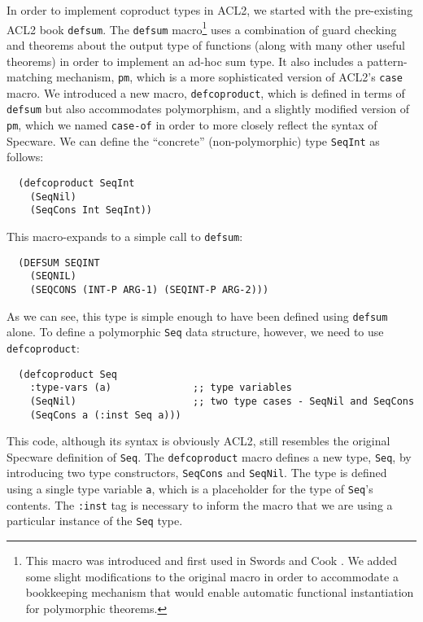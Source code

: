 \documentclass[]{eptcs}
\begin{document}
In order to implement coproduct types in ACL2, we started with the pre-existing ACL2 book \verb|defsum|. The \verb|defsum| macro\footnote{This macro was introduced and first used in Swords and Cook \cite{swords}. We added some slight modifications to the original macro in order to accommodate a bookkeeping mechanism that would enable automatic functional instantiation for polymorphic theorems.} uses a combination of guard checking and theorems about the output type of functions (along with many other useful theorems) in order to implement an ad-hoc sum type. It also includes a pattern-matching mechanism, \verb|pm|, which is a more sophisticated version of ACL2's \verb|case| macro. We introduced a new macro, \verb|defcoproduct|, which is defined in terms of \verb|defsum| but also accommodates polymorphism, and a slightly modified version of \verb|pm|, which we named \verb|case-of| in order to more closely reflect the syntax of Specware. We can define the ``concrete'' (non-polymorphic) type \verb|SeqInt| as follows:
\begin{verbatim}
  (defcoproduct SeqInt
    (SeqNil)
    (SeqCons Int SeqInt))
\end{verbatim}
This macro-expands to a simple call to \verb|defsum|:
\begin{verbatim}
  (DEFSUM SEQINT
    (SEQNIL)
    (SEQCONS (INT-P ARG-1) (SEQINT-P ARG-2)))
\end{verbatim}
As we can see, this type is simple enough to have been defined using \verb|defsum| alone. To define a polymorphic \verb|Seq| data structure, however, we need to use \verb|defcoproduct|:
\begin{verbatim}
  (defcoproduct Seq
    :type-vars (a)              ;; type variables
    (SeqNil)                    ;; two type cases - SeqNil and SeqCons
    (SeqCons a (:inst Seq a)))
\end{verbatim}
This code, although its syntax is obviously ACL2, still resembles the original Specware definition of \verb|Seq|. The \verb|defcoproduct| macro defines a new type, \verb|Seq|, by introducing two type constructors, \verb|SeqCons| and \verb|SeqNil|. The type is defined using a single type variable \verb|a|, which is a placeholder for the type of \verb|Seq|'s contents. The \verb|:inst| tag is necessary to inform the macro that we are using a particular instance of the \verb|Seq| type.
\end{document}
